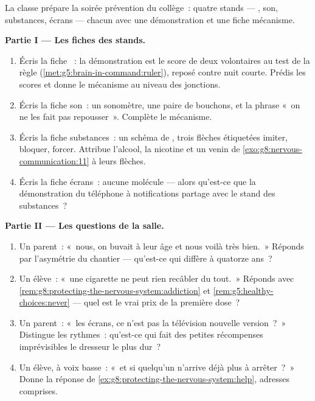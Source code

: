 \begin{problem}\label{pb:g8:protecting-the-nervous-system:1}
La classe prépare la soirée prévention du collège~: quatre
stands --- , son, substances, écrans --- chacun avec
une démonstration et une fiche mécanisme.

\medskip\noindent\textbf{Partie I --- Les fiches des
stands.}
\begin{enumerate}
  \item Écris la fiche ~: la démonstration est le
        score de deux volontaires au test de la règle
        (\cref{met:g5:brain-in-command:ruler}), reposé
        contre nuit courte. Prédis les scores et donne le
        mécanisme au niveau des jonctions.
  \item Écris la fiche son~: un sonomètre, une paire de
        bouchons, et la phrase «~on ne les fait pas
        repousser~». Complète le mécanisme.
  \item Écris la fiche substances~: un schéma de ,
        trois flèches étiquetées imiter, bloquer, forcer.
        Attribue l'alcool, la nicotine et un venin de
        \cref{exo:g8:nervous-communication:11} à leurs
        flèches.
  \item Écris la fiche écrans~: aucune molécule --- alors
        qu'est-ce que la démonstration du téléphone à
        notifications partage avec le stand des
        substances~?
\end{enumerate}

\medskip\noindent\textbf{Partie II --- Les questions de la
salle.}
\begin{enumerate}[resume]
  \item Un parent~: «~nous, on buvait à leur âge et nous
        voilà très bien.~» Réponds par l'asymétrie du
        chantier --- qu'est-ce qui diffère à quatorze ans~?
  \item Un élève~: «~une cigarette ne peut rien recâbler
        du tout.~» Réponds avec
        \cref{rem:g8:protecting-the-nervous-system:addiction}
        et \cref{rem:g5:healthy-choices:never} --- quel est
        le vrai prix de la première dose~?
  \item Un parent~: «~les écrans, ce n'est pas la
        télévision nouvelle version~?~» Distingue les
        rythmes~: qu'est-ce qui fait des petites récompenses
        imprévisibles le dresseur le plus dur~?
  \item Un élève, à voix basse~: «~et si quelqu'un
        n'arrive déjà plus à arrêter~?~» Donne la réponse
        de \cref{ex:g8:protecting-the-nervous-system:help},
        adresses comprises.
\end{enumerate}


\end{problem}
